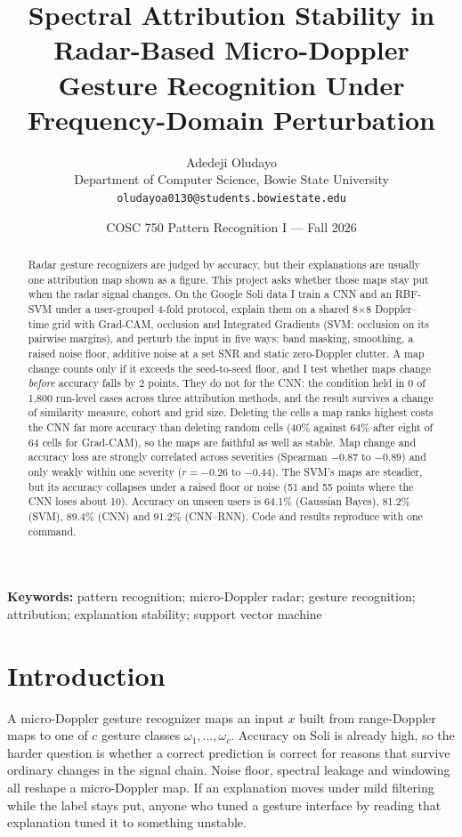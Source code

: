 \documentclass[11pt]{article}
\title{Spectral Attribution Stability in Radar-Based Micro-Doppler Gesture Recognition Under Frequency-Domain Perturbation}
\author{
  Adedeji Oludayo \\
  Department of Computer Science, Bowie State University \\
  \texttt{oludayoa0130@students.bowiestate.edu}
}
\date{COSC 750 Pattern Recognition I --- Fall 2026}
\begin{document}
\maketitle
\vspace{-1.6em}

\begin{abstract}
Radar gesture recognizers are judged by accuracy, but their explanations are usually one attribution map shown as a figure. This project asks whether those maps stay put when the radar signal changes. On the Google Soli data I train a CNN and an RBF-SVM under a user-grouped 4-fold protocol, explain them on a shared 8$\times$8 Doppler--time grid with Grad-CAM, occlusion and Integrated Gradients (SVM: occlusion on its pairwise margins), and perturb the input in five ways: band masking, smoothing, a raised noise floor, additive noise at a set SNR and static zero-Doppler clutter. A map change counts only if it exceeds the seed-to-seed floor, and I test whether maps change \emph{before} accuracy falls by 2 points. They do not for the CNN: the condition held in 0 of 1{,}800 run-level cases across three attribution methods, and the result survives a change of similarity measure, cohort and grid size. Deleting the cells a map ranks highest costs the CNN far more accuracy than deleting random cells (40\% against 64\% after eight of 64 cells for Grad-CAM), so the maps are faithful as well as stable. Map change and accuracy loss are strongly correlated across severities (Spearman $-0.87$ to $-0.89$) and only weakly within one severity ($r=-0.26$ to $-0.44$). The SVM's maps are steadier, but its accuracy collapses under a raised floor or noise (51 and 55 points where the CNN loses about 10). Accuracy on unseen users is 64.1\% (Gaussian Bayes), 81.2\% (SVM), 89.4\% (CNN) and 91.2\% (CNN--RNN). Code and results reproduce with one command.
\end{abstract}

\noindent\textbf{Keywords:} pattern recognition; micro-Doppler radar; gesture recognition; attribution; explanation stability; support vector machine

\section{Introduction}
A micro-Doppler gesture recognizer maps an input $x$ built from range-Doppler maps to one of $c$ gesture classes $\omega_1,\dots,\omega_c$. Accuracy on Soli is already high, so the harder question is whether a correct prediction is correct for reasons that survive ordinary changes in the signal chain. Noise floor, spectral leakage and windowing all reshape a micro-Doppler map. If an explanation moves under mild filtering while the label stays put, anyone who tuned a gesture interface by reading that explanation tuned it to something unstable.
\end{document}

